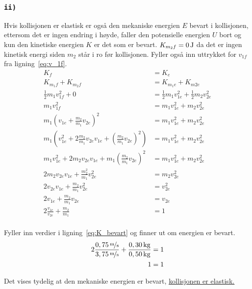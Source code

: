 \documentclass{article}
\let\oldsubsubsection\subsubsection
\renewcommand{\subsubsection}[1]{%
  \oldsubsubsection{\texttt{#1}}%
}
\begin{document}
\clearpage
\subsubsection{ii)}
Hvis kollisjonen er elastisk er også den mekaniske energien \(E\) bevart i kollisjonen, ettersom det er ingen endring i høyde, faller den potensielle energien \(U\) bort og kun den kinetiske energien \(K\) er det som er bevart. \(K_{m_2f} = \unit[0]{J}\) da det er ingen kinetisk energi siden \(m_2\) står i ro før kollisjonen. Fyller også inn uttrykket for \(v_{1f}\) fra ligning~\ref{eq:v_1f}.
\begin{equation}
\begin{split}
    K_f &= K_e \\
    K_{m_1f} + K_{m_2f} &= K_{m_1e} + K_{m2e} \\
    \frac{1}{2}m_1 v^2_{1f} + 0 &= \frac{1}{2}m_1 v^2_{1e} + \frac{1}{2}m_2 v^2_{2e} \\
    m_1 v^2_{1f} &= m_1 v^2_{1e} + m_2 v^2_{2e} \\
    m_1 \left(v_{1e} + \frac{m_2}{m_1} v_{2e}\right)^2 &= m_1 v^2_{1e} + m_2 v^2_{2e} \\
    m_1 \left(v^2_{1e} + 2\frac{m_2}{m_1} v_{2e}v_{1e} + \left(\frac{m_2}{m_1} v_{2e}\right)^2\right) &= m_1 v^2_{1e} + m_2 v^2_{2e} \\
    m_1v^2_{1e} + 2m_2 v_{2e}v_{1e} + m_1\left(\frac{m_2}{m_1} v_{2e}\right)^2 &= m_1 v^2_{1e} + m_2 v^2_{2e} \\
    2m_2 v_{2e}v_{1e} + \frac{m^2_2}{m_1} v^2_{2e} &= m_2 v^2_{2e} \\
    2v_{2e}v_{1e} + \frac{m_2}{m_1} v^2_{2e} &= v^2_{2e} \\
    2v_{1e} + \frac{m_2}{m_1} v_{2e} &= v_{2e} \\
    2\frac{v_{1e}}{v_{2e}} + \frac{m_2}{m_1} &= 1 \\
\end{split}
\label{eq:K_bevart}
\end{equation}

Fyller inn verdier i ligning~\ref{eq:K_bevart} og finner ut om energien er bevart.
\begin{equation*}
\begin{split}
    2\frac{\unitfrac[0,75]{m}{s}}{\unitfrac[3,75]{m}{s}} + \frac{\unit[0,30]{kg}}{\unit[0,50]{kg}} &= 1 \\
    1 &= 1
\end{split}
\end{equation*}

Det vises tydelig at den mekaniske energien er bevart, \underline{\underline{kollisjonen er elastisk.}}
\end{document}
